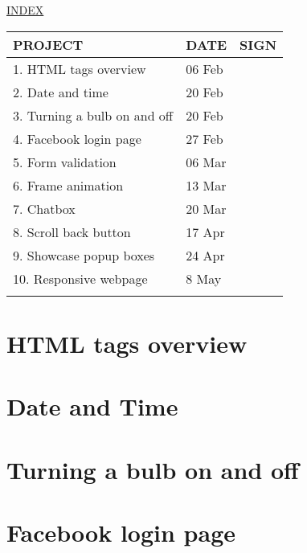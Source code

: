 \documentclass[12pt]{article}
\begin{document}

\Huge
{}
\centering \underline{INDEX} \\
\vspace*{3\baselineskip}
\setlength{\arrayrulewidth}{0.4mm}
\renewcommand{\arraystretch}{1.8}
\setlength{\tabcolsep}{10pt}

\LARGE
\begin{tabular}{|m{8.5cm}|m{2.2cm}|m{3cm}|}
  \hline
  PROJECT & DATE & SIGN \\
  \hline
  \hline
  1. HTML tags overview & 06 Feb & \\
  2. Date and time & 20 Feb & \\
  3. Turning a bulb on and off & 20 Feb & \\
  4. Facebook login page & 27 Feb & \\
  5. Form validation & 06 Mar & \\
  6. Frame animation & 13 Mar & \\
  7. Chatbox & 20 Mar & \\
  8. Scroll back button & 17 Apr & \\
  9. Showcase popup boxes & 24 Apr & \\
  10. Responsive webpage & 8 May & \\
  & & \\
  \hline
\end{tabular}
\newpage
\restoregeometry
\normalsize

\section{HTML tags overview}
\newpage

\section{Date and Time}

\section{Turning a bulb on and off}
\newpage

\section{Facebook login page}
\newpage
\end{document}
